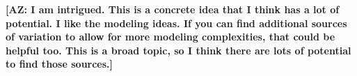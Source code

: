 \vspace{3em}

\noindent \textbf{[AZ: I am intrigued. This is a concrete idea that I think has a lot of potential. I like the modeling ideas. If you can find additional sources of variation to allow for more modeling complexities, that could be helpful too. This is a broad topic, so I think there are lots of potential to find those sources.]}

\singlespacing



\pagebreak
\renewcommand*{\thepage}{A.\arabic{page}}
\setcounter{page}{0}
\setcounter{equation}{0}
\renewcommand{\theequation}{A.\arabic{equation}}
\setcounter{section}{0}
\renewcommand{\thesection}{A.\arabic{section}}
\renewcommand{\thefigure}{A.\arabic{figure}}
\setcounter{figure}{0}
\renewcommand{\thetable}{A.\arabic{table}}
\setcounter{table}{0}
\thispagestyle{empty}


